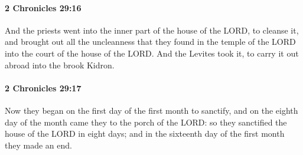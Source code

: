 		\paragraph{2 Chronicles 29:16} %
			\label{2CHRONICLES-29-16}

			And the priests went into the inner part of the house of the LORD, to cleanse it, and brought out all the uncleanness that they found in the temple of the LORD into the court of the house of the LORD. And the Levites took it, to carry it out abroad into the brook Kidron.


		\paragraph{2 Chronicles 29:17} %
			\label{2CHRONICLES-29-17}

			Now they began on the first day of the first month to sanctify, and on the eighth day of the month came they to the porch of the LORD: so they sanctified the house of the LORD in eight days; and in the sixteenth day of the first month they made an end.

